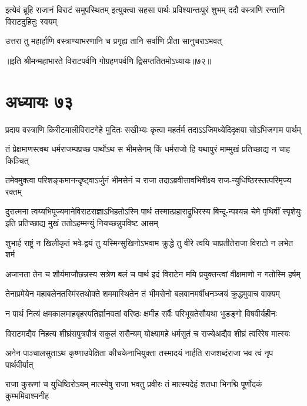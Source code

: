 \threelineshloka
{इत्येवं ब्रूहि राजानं विराटं समुपस्थितम्}
{इत्युक्त्वा सहसा पार्थः प्रविश्यान्तःपुरं शुभम्}
{ददौ वस्त्राणि रन्तानि विराटदुहितुः स्वयम्}


\twolineshloka
{उत्तरा तु महार्हाणि वस्त्राण्याभरणानि च}
{प्रगृह्य तानि सर्वाणि प्रीता सानुचराऽभवत्}

॥इति श्रीमन्महाभारते विराटपर्वणि गोग्रहणपर्वणि द्विसप्ततितमोऽध्यायः॥७२॥

\chapter{अध्यायः ७३}

\twolineshloka
{प्रदाय वस्त्राणि किरीटमालीविराटगेहे मुदितः सखीभ्यः}
{कृत्वा महर्तर्म तदाऽऽजिमध्येदिदृक्षया सोऽभिजगाम पार्थम्}


\twolineshloka
{तं प्रेक्षमाणस्त्वथ धर्मराजम्पप्रच्छ पार्थोऽथ स भीमसेनम्}
{किं धर्मराजो हि यथापुरं माम्मुखं प्रतिच्छाद्य न चाह किञ्चित्}


\twolineshloka
{तमेवमुक्त्वा परिशङ्कमानन्दृष्ट्वाऽर्जुनं भीमसेनं च राजा}
{तदाऽब्रवीत्तावभिवीक्ष्य राज-न्युधिष्ठिरस्तत्परिमृज्य रक्तम्}


\threelineshloka
{दुरात्मना त्वय्यभिपूज्यमानेविराटराज्ञाऽभिहतोऽस्मि पार्थ}
{तस्मात्प्रहाराद्रुधिरस्य बिन्दू-न्पश्यन्न चेमे पृथिवीं स्पृशेयुः}
{इति प्रतिच्छाद्य मुखं ततोऽहम्मन्युं नियच्छन्नुपविष्ट आसम्}


\twolineshloka
{शुभार्ह राष्ट्रं न खिलीकृतं भवे-द्वयं तु यस्मिन्सुखिनोऽभवाम}
{क्रुद्धे तु वीरे त्वयि चाप्रतीतेराजा विराटो न लभेत शर्म}


\twolineshloka
{अजानता तेन च शौर्यमाजौछन्नस्य सत्रेण बलं च पार्थ}
{इदं विराटेन मयि प्रयुक्तन्त्वां वीक्षमाणो न गतोस्मि हर्षम्}


\twolineshloka
{तेनाप्रमेयेन महाबलेनतस्मिंस्तथोक्ते शममास्थितेन}
{तं भीमसेनो बलवानमर्षीधनञ्जयं क्रुद्धमुवाच वाक्यम्}


\twolineshloka
{न पार्थ नित्यं क्षमकालमाहबृहस्पतिर्ज्ञानवतां वरिष्ठः}
{क्षमीह सर्वैः परिभूयतेसौयथा भुडङ्गो विषवीर्यहीनः}


\twolineshloka
{विराटमद्यैव निहत्य शीघ्रंसपुत्रपौत्रं सकुलं ससैन्यम्}
{योक्ष्यामहे धर्मसुतं च राज्येअद्यैव शीघ्रं त्वरिरेष मात्स्यः}


\twolineshloka
{अनेन पाञ्चालसुताऽथ कृष्णाउपेक्षिता कीचकेनाभियुक्ता}
{तस्मादयं नार्हति राजशब्दंराजा भव त्वं नृप पार्थवीर्यात्}


\fourlineindentedshloka
{राजा कुरूणां च युधिष्ठिरोऽयम्}
{मात्स्येषु राजा भवतु प्रवीरः}
{तं मात्स्यदेहं शतधा भिनद्मि}
{पूर्णोदकं कुम्भमिवाश्मनीह}

